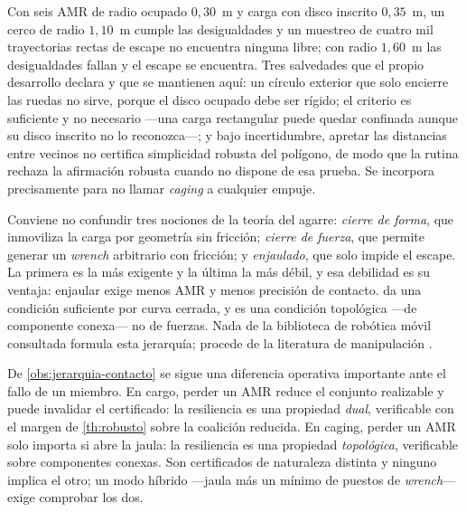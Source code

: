 \begin{observacion}
\label{obs:cerco-num}
Con seis AMR de radio ocupado $0{,}30$~m y carga con disco inscrito $0{,}35$~m,
un cerco de radio $1{,}10$~m cumple las desigualdades y un muestreo de cuatro
mil trayectorias rectas de escape no encuentra ninguna libre; con radio
$1{,}60$~m las desigualdades fallan y el escape se encuentra. Tres salvedades
que el propio desarrollo declara y que se mantienen aquí: un círculo exterior
que solo encierre las ruedas no sirve, porque el disco ocupado debe ser rígido;
el criterio es suficiente y no necesario —una carga rectangular puede quedar
confinada aunque su disco inscrito no lo reconozca—; y bajo incertidumbre,
apretar las distancias entre vecinos no certifica simplicidad robusta del
polígono, de modo que la rutina rechaza la afirmación robusta cuando no dispone
de esa prueba. Se incorpora precisamente para no llamar \emph{caging} a
cualquier empuje.
\end{observacion}

\begin{observacion}
\label{obs:jerarquia-contacto}
Conviene no confundir tres nociones de la teoría del agarre:
\emph{cierre de forma}, que inmoviliza la carga por geometría sin fricción;
\emph{cierre de fuerza}, que permite generar un \emph{wrench} arbitrario con
fricción; y \emph{enjaulado}, que solo impide el escape. La primera es la más
exigente y la última la más débil, y esa debilidad es su ventaja: enjaular exige
menos AMR y menos precisión de contacto.  da una condición
suficiente por curva cerrada, y es una condición topológica —de componente
conexa— no de fuerzas. Nada de la biblioteca de robótica móvil consultada
formula esta jerarquía; procede de la literatura de manipulación
\cite{rimon1996caging,bicchi1995closure}.
\end{observacion}

\begin{observacion}
\label{obs:dos-resiliencias}
De \cref{obs:jerarquia-contacto} se sigue una diferencia operativa importante
ante el fallo de un miembro. En \textsf{cargo}, perder un AMR reduce el conjunto
realizable y puede invalidar el certificado: la resiliencia es una propiedad
\emph{dual}, verificable con el margen de \cref{th:robusto} sobre la coalición
reducida. En \textsf{caging}, perder un AMR solo importa si abre la jaula: la
resiliencia es una propiedad \emph{topológica}, verificable sobre componentes
conexas. Son certificados de naturaleza distinta y ninguno implica el otro; un
modo híbrido —jaula más un mínimo de puestos de \emph{wrench}— exige comprobar
los dos.
\end{observacion}

